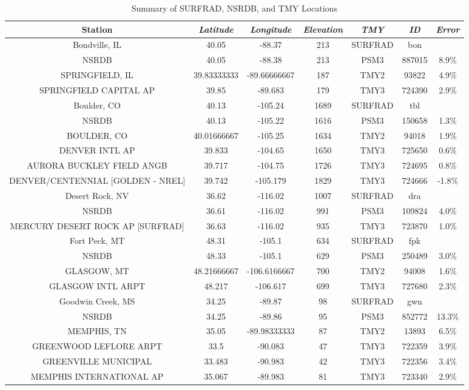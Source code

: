 \documentclass[conference]{IEEEtran}
\begin{document}
\begin{table}[htbp]
\caption{Summary of SURFRAD, NSRDB, and TMY Locations}
\begin{center}
\begin{tabular}{|c|c|c|c|c|c|c|}
\hline
\textbf{Station}&\textbf{\textit{Latitude}}&\textbf{\textit{Longitude}}&\textbf{\textit{Elevation}}&\textbf{\textit{TMY}}&\textbf{\textit{ID}}&\textbf{\textit{Error}} \\
\hline
Bondville, IL&40.05&-88.37&213&SURFRAD&bon& \\
NSRDB&40.05&-88.38&213&PSM3&887015&8.9\% \\
SPRINGFIELD, IL&39.83333333&-89.66666667&187&TMY2&93822&4.9\% \\
SPRINGFIELD CAPITAL AP&39.85&-89.683&179&TMY3&724390&2.9\% \\
\hline
Boulder, CO&40.13&-105.24&1689&SURFRAD&tbl& \\
NSRDB&40.13&-105.22&1616&PSM3&150658&1.3\% \\
BOULDER, CO&40.01666667&-105.25&1634&TMY2&94018&1.9\% \\
DENVER INTL AP&39.833&-104.65&1650&TMY3&725650&0.6\% \\
AURORA BUCKLEY FIELD ANGB&39.717&-104.75&1726&TMY3&724695&0.8\% \\
DENVER/CENTENNIAL [GOLDEN - NREL]&39.742&-105.179&1829&TMY3&724666&-1.8\% \\
\hline
Desert Rock, NV&36.62&-116.02&1007&SURFRAD&dra& \\
NSRDB&36.61&-116.02&991&PSM3&109824&4.0\% \\
MERCURY DESERT ROCK AP [SURFRAD]&36.63&-116.02&935&TMY3&723870&1.0\% \\
\hline
Fort Peck, MT&48.31&-105.1&634&SURFRAD&fpk& \\
NSRDB&48.33&-105.1&629&PSM3&250489&3.0\% \\
GLASGOW, MT&48.21666667&-106.6166667&700&TMY2&94008&1.6\% \\
GLASGOW INTL ARPT&48.217&-106.617&699&TMY3&727680&2.3\% \\
\hline
Goodwin Creek, MS&34.25&-89.87&98&SURFRAD&gwn& \\
NSRDB&34.25&-89.86&95&PSM3&852772&13.3\% \\
MEMPHIS, TN&35.05&-89.98333333&87&TMY2&13893&6.5\% \\
GREENWOOD LEFLORE ARPT&33.5&-90.083&47&TMY3&722359&3.9\% \\
GREENVILLE MUNICIPAL&33.483&-90.983&42&TMY3&722356&3.4\% \\
MEMPHIS INTERNATIONAL AP&35.067&-89.983&81&TMY3&723340&2.9\% \\

\end{tabular}
\end{center}
\end{table}
\end{document}
